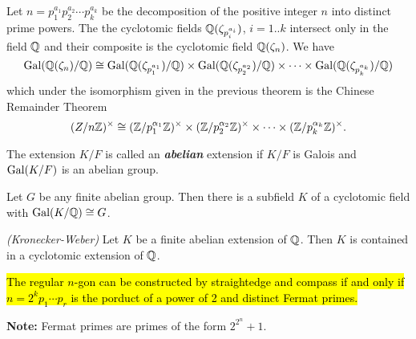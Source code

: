 \nl

\begin{cor}
Let $n = p_1^{a_1}p_2^{a_2}\cdots p_k^{a_k}$ be the decomposition of the positive integer $n$ into distinct prime powers. The the cyclotomic fields $\mathbb{Q}(\zeta_{p_i^{a_i}})$, $i = 1..k$ intersect only in the field $\mathbb{Q}$ and their composite is the cyclotomic field $\mathbb{Q}(\zeta_n)$. We have
\[\text{Gal}(\mathbb{Q}(\zeta_n)/\mathbb{Q})\cong \text{Gal}(\mathbb{Q}(\zeta_{p_1^{a_1}})/\mathbb{Q}) \times \text{Gal}(\mathbb{Q}(\zeta_{p_2^{a_2}})/\mathbb{Q}) \times \cdots \times \text{Gal}(\mathbb{Q}(\zeta_{p_k^{a_k}})/\mathbb{Q})\]
which under the isomorphism given in the previous theorem is the Chinese Remainder Theorem
\[(Z/n\mathbb{Z})^\times \cong (\mathbb{Z}/p_1^{\alpha_1}\mathbb{Z})^\times\times(\mathbb{Z}/p_2^{\alpha_2}\mathbb{Z})^\times\times\cdots\times (\mathbb{Z}/p_k^{\alpha_k}\mathbb{Z})^\times.\]
\end{cor}

\nl

\begin{defn}
The extension $K/F$ is called an \textit{\textbf{abelian}} extension if $K/F$ is Galois and $\text{Gal}(K/F)$ is an abelian group.
\end{defn}

\nl

\begin{cor}
Let $G$ be any finite abelian group. Then there is a subfield $K$ of a cyclotomic field with $\text{Gal}(K/\mathbb{Q}) \cong G$.
\end{cor}

\nl

\begin{thm}\textit{(Kronecker-Weber)}
Let $K$ be a finite abelian extension of $\mathbb{Q}$. Then $K$ is contained in a cyclotomic extension of $\mathbb{Q}$.
\end{thm}

\nl

\begin{prop}
\hl{The regular $n$-gon can be constructed by straightedge and compass if and only if $n = 2^kp_1\cdots p_r$ is the porduct of a power of 2 and distinct Fermat primes.}
\end{prop}

\nl

\textbf{Note:} Fermat primes are primes of the form $2^{2^n}+1$.












